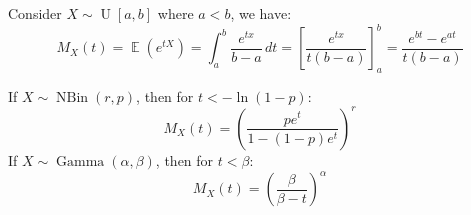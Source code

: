 \documentclass{huhtakm-template-book-v2}
\DeclareMathOperator{\E}{\mathbb{E}}
\DeclareMathOperator{\NBin}{NBin}
\DeclareMathOperator{\U}{U}
\DeclareMathOperator{\Gam}{Gamma}
\begin{document}
\begin{eg}
	Consider $X\sim\U[a,b]$ where $a<b$, we have:
	\begin{equation*}
		M_{X}(t)=\E(e^{tX})=\int_{a}^{b}\frac{e^{tx}}{b-a}\,dt=\left[\frac{e^{tx}}{t(b-a)}\right]_{a}^{b}=\frac{e^{bt}-e^{at}}{t(b-a)}
	\end{equation*}
\end{eg}
\begin{eg}
	If $X\sim\NBin(r,p)$, then for $t<-\ln(1-p)$:
	\begin{equation*}
		M_{X}(t)=\left(\frac{pe^{t}}{1-(1-p)e^{t}}\right)^{r}
	\end{equation*}
	If $X\sim\Gam(\alpha,\beta)$, then for $t<\beta$:
	\begin{equation*}
		M_{X}(t)=\left(\frac{\beta}{\beta-t}\right)^{\alpha}
	\end{equation*}
\end{eg}
\end{document}
